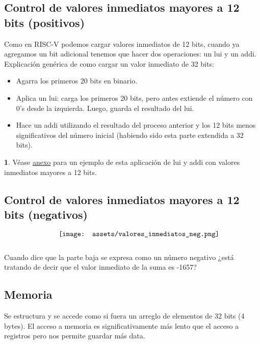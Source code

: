 \documentclass[10pt,a4paper]{article}
\begin{document}
\subsection*{Control de valores inmediatos mayores a 12 bits (positivos)}
Como en RISC-V podemos cargar valores inmediatos de 12 bits, cuando ya agregamos un bit adicional tenemos que hacer dos operaciones: un lui y un addi. \\
Explicación genérica de como cargar un valor inmediato de 32 bits:
\begin{itemize}
    \item Agarra los primeros 20 bits en binario.
    \item Aplica un lui: carga los primeros 20 bits, pero antes extiende el número con 0's desde la izquierda. Luego, guarda el resultado del lui.
    \item Hace un addi utilizando el resultado del proceso anterior y los 12 bits menos significativos del número inicial (habiendo sido esta parte extendida a 32 bits).
\end{itemize}
\textbf{1}.  
Véase \hyperref[subsec:valores_inmediatos_32_bits]{anexo} para un ejemplo de esta aplicación de lui y addi con valores inmediatos mayores a 12 bits.
\subsection*{Control de valores inmediatos mayores a 12 bits (negativos)}
\[\begin{minipage}[b]{0.6\textwidth}
    \texttt{[image: assets/valores\_inmediatos\_neg.png]}
    \label{fig:valores_neg}
\end{minipage}\]
Cuando dice que la parte baja se expresa como un número negativo ¿está tratando de decir que el valor inmediato de la suma es -1657?
\subsection*{Memoria}
Se estructura y se accede como si fuera un arreglo de elementos de 32 bits (4 bytes). El acceso a memoria es significativamente más lento que el acceso a registros pero nos permite guardar más data. \\
\end{document}
